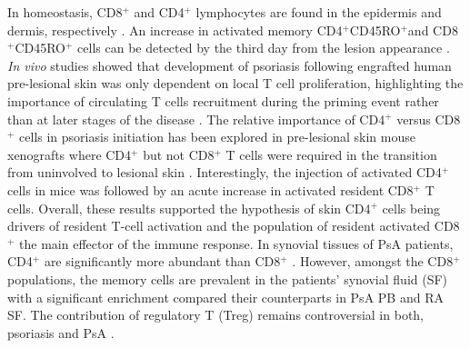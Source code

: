 In homeostasis, CD8$^+$ and CD4$^+$ lymphocytes are found in the epidermis and dermis, respectively \parencite{Clark2006}. An increase in activated memory CD4$^{+}$CD45RO$^{+}$and CD8$^{+}$CD45RO$^{+}$ cells can be detected by the third day from the lesion appearance \parencite{Clark2006,Perera2012}. \textit{In vivo} studies showed that development of psoriasis following engrafted human pre-lesional skin was only dependent on local T cell proliferation, highlighting the importance of circulating T cells recruitment during the priming event rather than at later stages of the disease \parencite{Wrone-Smith1996,Nickoloff1999,Perera2012}. The relative importance of CD4$^+$ versus CD8$^+$ cells in psoriasis initiation has been explored in pre-lesional skin mouse xenografts where CD4$^+$ but not CD8$^+$ T cells were required in the transition from uninvolved to lesional skin \parencite{Nickoloff1999}. Interestingly, the injection of activated CD4$^+$ cells in mice was followed by an acute increase in activated resident CD8$^+$ T cells. Overall, these results supported the hypothesis of skin CD4$^+$ cells being drivers of resident T-cell activation and the population of resident activated CD8$^+$ the main effector of the immune response. In synovial tissues of PsA patients, CD4$^+$ are significantly more abundant than CD8$^+$ \parencite{Diani2015}. However, amongst the CD8$^+$ populations, the memory cells are prevalent in the patients’ synovial fluid (SF) with a significant enrichment compared their counterparts in PsA PB and RA SF\parencite{Costello1999}. The contribution of regulatory T (Treg) remains controversial in both, psoriasis and PsA \parencite{Perera2012}. 

